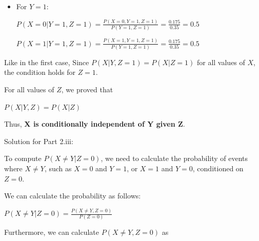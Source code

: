 \documentclass[12pt,letterpaper, onecolumn]{exam}
\begin{document}
\begin{questions}
\begin{parts}
\begin{subparts}
\begin{solution}
\begin{itemize}
\begin{center}
                    $\displaystyle{P(X=1|Y=0, Z=1) = \frac{P(X=1, Y=0, Z=1)}{P(Y=0, Z=1)} = \frac{0.1}{0.2} = 0.5}$
                    \end{center}

                    \item For $Y=1$:
                    \begin{center}
                    $\displaystyle{P(X=0|Y=1, Z=1) = \frac{P(X=0, Y=1, Z=1)}{P(Y=1, Z=1)} = \frac{0.175}{0.35} = 0.5}$

                    $\displaystyle{P(X=1|Y=1, Z=1) = \frac{P(X=1, Y=1, Z=1)}{P(Y=1, Z=1)} = \frac{0.175}{0.35} = 0.5}$
                    \end{center}
                \end{itemize}

                Like in the first case, Since $P(X|Y, Z=1) = P(X|Z=1)$ for all values of $X$, the condition holds for $Z=1$.

                For all values of $Z$, we proved that 

                \begin{center}
                    $\displaystyle{P(X|Y,Z) = P(X|Z)}$
                \end{center}

                Thus, \textbf{X is conditionally independent of Y given Z}.

            \end{solution}

            \pagebreak

            \subpart[5] Solution for Part 2.iii:
    
            \begin{solution}

                To compute $P(X \neq Y | Z = 0)$, we need to calculate the probability of events where $X \neq Y$, 
                such as $X=0$ and $Y=1$, or $X=1$ and $Y=0$, conditioned on $Z = 0$.

                We can calculate the probability as follows:

                \begin{center}
                    $\displaystyle{P(X \neq Y | Z = 0) = \frac{P(X \neq Y, Z = 0)}{P(Z=0)}}$
                \end{center}

                Furthermore, we can calculate $P(X \neq Y, Z = 0)$ as


\end{solution}
\end{subparts}
\end{parts}
\end{questions}
\end{document}
